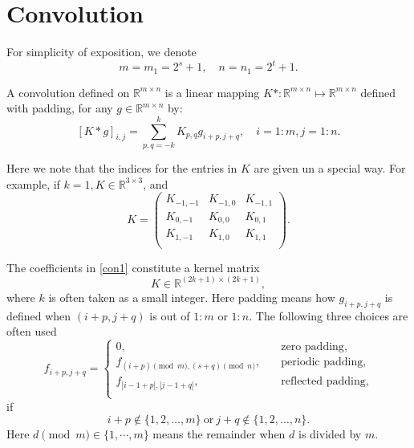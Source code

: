 \section{Convolution}
For simplicity of exposition, we denote 
\begin{equation}\label{eq:size_f}
m = m_1 = 2^{s} + 1,  \quad n = n_1 = 2^t  +1.
\end{equation}
\begin{definition}
A convolution defined on $\mathbb{R}^{m\times n}$ is a linear mapping 
$K\ast: \mathbb{R}^{m\times n}\mapsto \mathbb{R}^{m\times n}$ defined with padding,  
for any $g \in \mathbb{R}^{m\times n}$ by:
\begin{equation}\label{con1}
[K \ast g]_{i,j} = \sum_{p,q=-k}^k K_{p, q} g_{i + p, j + q}, \quad i=1:m, j = 1:n.
\end{equation}
\end{definition}
Here we note that the indices for the entries in $K$ are given un a special way. 
For example, if $k=1, K\in \mathbb R^{3\times 3}$, and 
$$
K=\begin{pmatrix}
	K_{-1,-1} &K_{-1,0} &K_{-1,1} \\
	K_{0,-1} &K_{0,0} &K_{0,1} \\
	K_{1,-1} &K_{1,0} &K_{1,1} \\
	\end{pmatrix}.
$$
  
The coefficients in \eqref{con1} constitute  a kernel matrix
\begin{equation}
K \in \mathbb{R}^{(2k+1) \times (2k+1)},
\end{equation}
where $k$ is often taken as a small integer. 
Here padding means how $ g_{i+ p, j + q}$ is defined
when $(i+ p, j + q)$ is out of $1:m$ or $1:n$. 
The following three choices are often used
\begin{equation}\label{eq:padding}
f_{i + p, j + q} = \begin{cases}
0,  \quad &\text{zero padding}, \\
f_{(i + p)\pmod{m}, (s + q)\pmod{n}},  \quad &\text{periodic padding}, \\
f_{|i-1 +p|, |j -1  +q|},  \quad &\text{reflected padding}, \\
\end{cases}
\end{equation}
if 
\begin{equation}
i + p \notin \{1, 2, \dots, m\} ~\text{or} ~  j+ q \notin \{1, 2, \dots, n\}.
\end{equation}
Here $ d \pmod{m} \in \{1, \cdots, m\} $  means the remainder when $d$ is divided by $m$.


